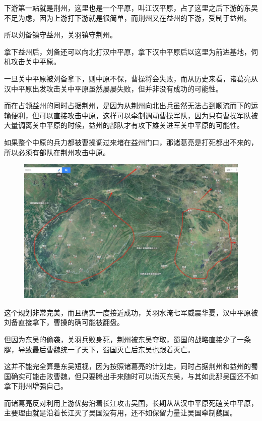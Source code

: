 \documentclass[UTF8, 11pt, oneside]{ctexart}
\begin{document}
下游第一站就是荆州，这里也是一个平原，叫江汉平原，占了这里之后下游的东吴不足为虑，因为上游打下游就是很简单，而荆州又在益州的下游，受制于益州。

所以刘备镇守益州，关羽镇守荆州。

拿下益州后，刘备还可以向北打汉中平原，拿下汉中平原后以这里为前进基地，伺机攻击关中平原。

一旦关中平原被刘备拿下，则中原不保，曹操将会失败，而从历史来看，诸葛亮从汉中平原出发攻击关中平原虽然屡屡失败，但并非没有成功的可能性。

而在占领益州的同时占据荆州，是因为从荆州向北出兵虽然无法占到顺流而下的运输便利，但可以直接攻击中原，这样可以牵制调动曹操军队，因为只有曹操军队被大量调离关中平原的时候，益州的部队才有攻下雄关进军关中平原的可能性。

如果整个中原的兵力都被曹操调过来堵在益州门口，那诸葛亮是打死都出不来的，所以必须有部队在荆州攻击中原。

\begin{figure}[H]
    \centering
    \includegraphics[width=13cm]{2024-08-19-005.jpg}
\end{figure}

这个规划非常完美，而且确实一度接近成功，关羽水淹七军威震华夏，汉中平原被刘备直接拿下，曹操的确可能被翻盘。

但因为东吴的偷袭，关羽兵败身死，荆州被东吴夺取，蜀国的战略直接少了一条腿，导致最后曹魏统一了天下，蜀国灭亡后东吴也跟着灭亡。

这并不能完全算是东吴短视，因为按照诸葛亮的计划走，同时占据荆州和益州的蜀国确实可能击败曹魏，但只要腾出手来随时可以消灭东吴，与其如此那吴国还不如拿下荆州增强自己。

而诸葛亮反对利用上游优势沿着长江攻击吴国，长期从从汉中平原死磕关中平原，主要理由就是沿着长江灭了吴国没有用，还不如保留力量让吴国牵制魏国。
\end{document}
